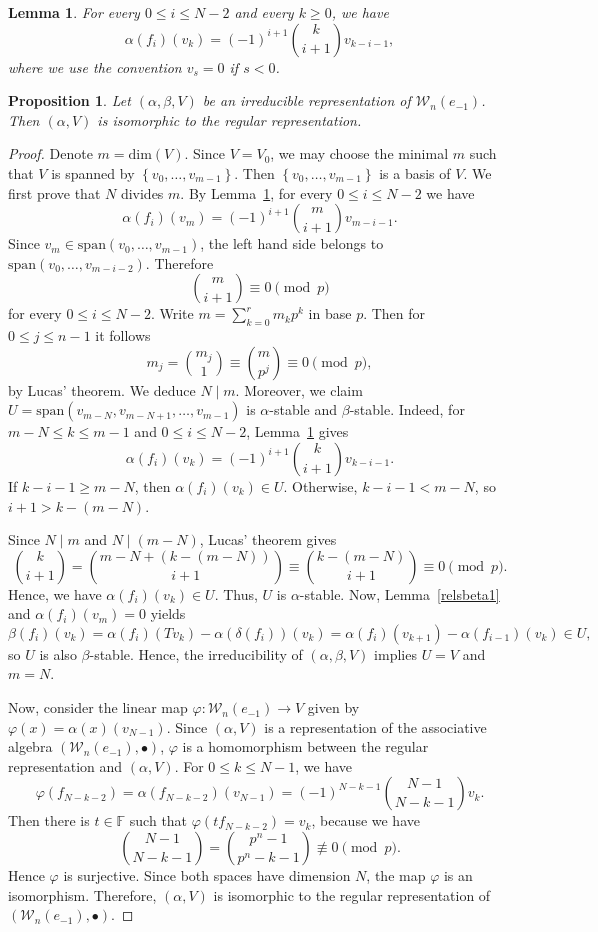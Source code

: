 \documentclass[10pt,a4paper]{amsart}
\newtheorem{lemma}{Lemma}
\newtheorem{proposition}{Proposition}
\begin{document}
\begin{lemma}\label{actionalpha}
For every $0\leq i\leq N-2$ and every $k\geq 0$, we have
$$
\alpha(f_i)(v_k)=(-1)^{i+1}\binom{k}{i+1}v_{k-i-1},
$$
where we use the convention $v_s=0$ if $s<0$.
\end{lemma}

\begin{proposition}
Let $(\alpha,\beta,V)$ be an irreducible representation of
$\mathcal{W}_n(e_{-1})$. Then $(\alpha,V)$ is isomorphic to the regular representation.
\end{proposition}

\begin{proof}
Denote $m=\textrm{dim}(V)$. Since $V=V_0$, we may choose the minimal $m$ such that
$V$ is spanned by $\left\{v_0,\dots,v_{m-1}\right\}$. Then $\left\{v_0,\dots,v_{m-1}\right\}$ is a basis of $V$.
We first prove that $N$ divides $m$. By Lemma~\ref{actionalpha}, for every $0\leq i\leq N-2$ we have
$$
\alpha(f_i)(v_m)=(-1)^{i+1}\binom{m}{i+1}v_{m-i-1}.
$$
Since $v_m\in \textrm{span}(v_0,\dots,v_{m-1})$, the left hand side belongs to
$\textrm{span}(v_0,\dots,v_{m-i-2})$. Therefore
$$
\binom{m}{i+1}\equiv 0 \pmod p
$$
for every $0\leq i\leq N-2$. 
Write $m = \sum_{k=0}^{r} m_k p^k$ in base $p$. Then for $0\leq j\leq n-1$ it follows
$$
m_j = \binom{m_j}{1} \equiv \binom{m}{p^j}\equiv 0 \pmod p,
$$
by Lucas' theorem.
We deduce $N\mid m$.
Moreover, we claim $U=\textrm{span}(v_{m-N},v_{m-N+1},\dots,v_{m-1})$ is $\alpha$-stable and $\beta$-stable. 
Indeed, for $m-N\leq k\leq m-1$ and $0\leq i\leq N-2$, Lemma~\ref{actionalpha} gives
$$
\alpha(f_i)(v_k)=(-1)^{i+1}\binom{k}{i+1}v_{k-i-1}.
$$
If $k-i-1\ge m-N$, then $\alpha(f_i)(v_k)\in U$. Otherwise, $k-i-1<m-N$, so
$i+1>k-(m-N).$

Since $N\mid m$ and $N\mid (m-N)$, Lucas' theorem gives
$$
\binom{k}{i+1}
=
\binom{m-N+(k-(m-N))}{i+1}
\equiv
\binom{k-(m-N)}{i+1}
\equiv 0 \pmod p.
$$
Hence, we have $\alpha(f_i)(v_k)\in U$. Thus, $U$ is $\alpha$-stable.
Now, Lemma~\ref{relsbeta1}  and $\alpha(f_i)(v_m) = 0$ yields
$$
\beta(f_i)(v_k)=\alpha(f_i)(Tv_k)-\alpha(\delta(f_i))(v_k)
=\alpha(f_i)(v_{k+1})-\alpha(f_{i-1})(v_k)\in U,
$$
so $U$ is also $\beta$-stable. Hence, the irreducibility of $(\alpha, \beta, V)$ implies $U=V$ and $m=N$.
\medskip

Now, consider the linear map $\varphi:\mathcal{W}_n(e_{-1})\to V$ given by
$
\varphi(x)=\alpha(x)(v_{N-1}).
$
Since $(\alpha,V)$ is a representation of the associative algebra $(\mathcal{W}_n(e_{-1}),\bullet)$, $\varphi$ is a homomorphism between the regular representation and $(\alpha,V)$.
For $0\leq k\leq N-1$, we have
$$
\varphi(f_{N-k-2})
=
\alpha(f_{N-k-2})(v_{N-1})
=
(-1)^{N-k-1}\binom{N-1}{N-k-1}v_k.
$$
Then there is $t\in \mathbb{F}$ such that $\varphi(tf_{N-k-2}) = v_k$, because we have
$$
\binom{N-1}{N-k-1} = \binom{p^n-1}{p^n-k-1}  \not\equiv 0 \pmod p.
$$
Hence $\varphi$ is surjective. Since both spaces have dimension $N$,  the map $\varphi$ is an isomorphism.
Therefore, $(\alpha,V)$ is isomorphic to the regular representation of $(\mathcal{W}_n(e_{-1}),\bullet)$.
\end{proof}
\end{document}
